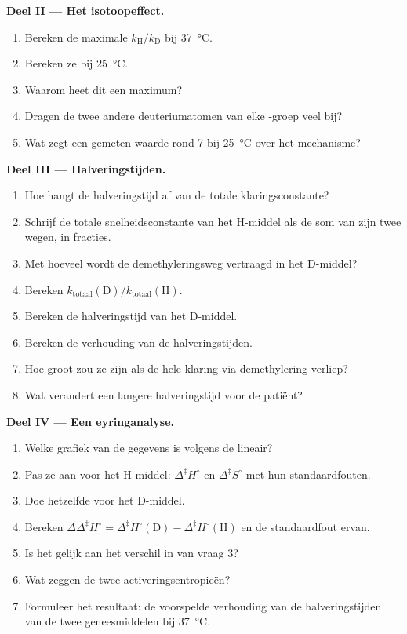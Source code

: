 \begin{problem}
\medskip\noindent\textbf{Deel II --- Het isotoopeffect.}
\begin{enumerate}[resume]
  \item Bereken de maximale $k_{\mathrm H}/k_{\mathrm D}$ bij \qty{37}{\celsius}.
  \item Bereken ze bij \qty{25}{\celsius}.
  \item Waarom heet dit een maximum?
  \item Dragen de twee andere deuteriumatomen van elke -groep veel bij?
  \item Wat zegt een gemeten waarde rond 7 bij \qty{25}{\celsius} over het
        mechanisme?
\end{enumerate}

\medskip\noindent\textbf{Deel III --- Halveringstijden.}
\begin{enumerate}[resume]
  \item Hoe hangt de halveringstijd af van de totale klaringsconstante?
  \item Schrijf de totale snelheidsconstante van het H-middel als de som
        van zijn twee wegen, in fracties.
  \item Met hoeveel wordt de demethyleringsweg vertraagd in het D-middel?
  \item Bereken $k_{\mathrm{totaal}}(\mathrm D)/k_{\mathrm{totaal}}(\mathrm H)$.
  \item Bereken de halveringstijd van het D-middel.
  \item Bereken de verhouding van de halveringstijden.
  \item Hoe groot zou ze zijn als de hele klaring via demethylering verliep?
  \item Wat verandert een langere halveringstijd voor de patiënt?
\end{enumerate}

\medskip\noindent\textbf{Deel IV --- Een eyringanalyse.}
\begin{enumerate}[resume]
  \item Welke grafiek van de gegevens is volgens de 
        lineair?
  \item Pas ze aan voor het H-middel: $\Delta^{\ddagger}H^\circ$ en $\Delta^{\ddagger}S^\circ$ met hun standaardfouten.
  \item Doe hetzelfde voor het D-middel.
  \item Bereken $\Delta\Delta^{\ddagger}H^\circ = \Delta^{\ddagger}H^\circ(\mathrm D) - \Delta^{\ddagger}H^\circ(\mathrm H)$ en de standaardfout ervan.
  \item Is het gelijk aan het verschil in  van vraag 3?
  \item Wat zeggen de twee activeringsentropieën?
  \item Formuleer het resultaat: de voorspelde verhouding van de
        halveringstijden van de twee geneesmiddelen bij \qty{37}{\celsius}.
\end{enumerate}
\end{problem}
